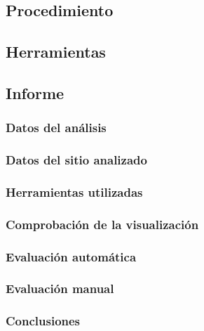 \documentclass[a4paper,11pt]{article}
\begin{document}
\subsection{Procedimiento}
\subsection{Herramientas}
\subsection{Informe}
\subsubsection{Datos del análisis}
\subsubsection{Datos del sitio analizado}
\subsubsection{Herramientas utilizadas}
\subsubsection{Comprobación de la visualización}
\subsubsection{Evaluación automática}
\subsubsection{Evaluación manual}
\subsubsection{Conclusiones}
\end{document}
